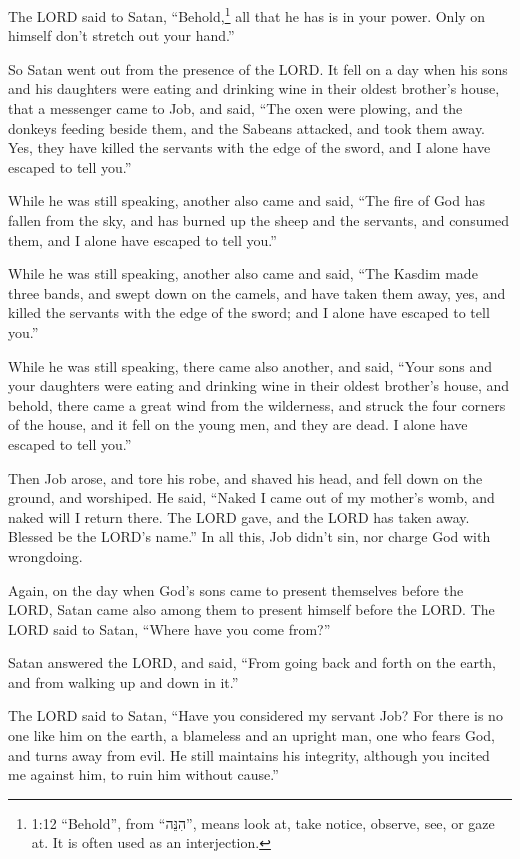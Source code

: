 \myverse{}The LORD said to Satan, “Behold,\footnote{1:12 “Behold”, from “הִנֵּה”, means look at, take notice, observe, see, or gaze at. It is often used as an interjection.} all that he has is in your power. Only on himself don’t stretch out your hand.”

So Satan went out from the presence of the LORD. \myverse{}It fell on a day when his sons and his daughters were eating and drinking wine in their oldest brother’s house, \myverse{}that a messenger came to Job, and said, “The oxen were plowing, and the donkeys feeding beside them, \myverse{}and the Sabeans attacked, and took them away. Yes, they have killed the servants with the edge of the sword, and I alone have escaped to tell you.”

\myverse{}While he was still speaking, another also came and said, “The fire of God has fallen from the sky, and has burned up the sheep and the servants, and consumed them, and I alone have escaped to tell you.”

\myverse{}While he was still speaking, another also came and said, “The Kasdim made three bands, and swept down on the camels, and have taken them away, yes, and killed the servants with the edge of the sword; and I alone have escaped to tell you.”

\myverse{}While he was still speaking, there came also another, and said, “Your sons and your daughters were eating and drinking wine in their oldest brother’s house, \myverse{}and behold, there came a great wind from the wilderness, and struck the four corners of the house, and it fell on the young men, and they are dead. I alone have escaped to tell you.”


\myverse{}Then Job arose, and tore his robe, and shaved his head, and fell down on the ground, and worshiped. \myverse{}He said, “Naked I came out of my mother’s womb, and naked will I return there. The LORD gave, and the LORD has taken away. Blessed be the LORD’s name.” \myverse{}In all this, Job didn’t sin, nor charge God with wrongdoing.


\mychapter{} \myverse*{}Again, on the day when God’s sons came to present themselves before the LORD, Satan came also among them to present himself before the LORD. \myverse{}The LORD said to Satan, “Where have you come from?”

Satan answered the LORD, and said, “From going back and forth on the earth, and from walking up and down in it.”


\myverse{}The LORD said to Satan, “Have you considered my servant Job? For there is no one like him on the earth, a blameless and an upright man, one who fears God, and turns away from evil. He still maintains his integrity, although you incited me against him, to ruin him without cause.”



